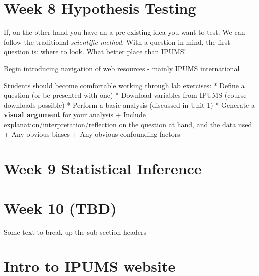 \documentclass[
]{book}
\newenvironment{Shaded}{\begin{snugshade}}{\end{snugshade}}
\newcommand{\AttributeTok}[1]{\textcolor[rgb]{0.77,0.63,0.00}{#1}}
\newcommand{\DecValTok}[1]{\textcolor[rgb]{0.00,0.00,0.81}{#1}}
\newcommand{\FunctionTok}[1]{\textcolor[rgb]{0.00,0.00,0.00}{#1}}
\newcommand{\NormalTok}[1]{#1}
\newcommand{\SpecialCharTok}[1]{\textcolor[rgb]{0.00,0.00,0.00}{#1}}
\begin{document}
\begin{Shaded}
\end{Shaded}

\hypertarget{hypothesis}{%
\section{Week 8 Hypothesis Testing}\label{hypothesis}}

If, on the other hand you have an a pre-existing idea you want to test. We can follow the traditional \emph{scientific method}. With a question in mind, the first question is: where to look. What better place than \href{https://ipums.org}{IPUMS}!

Begin introducing navigation of web resources - mainly IPUMS international

Students should become comfortable working through lab exercises:
* Define a question (or be presented with one)
* Download variables from IPUMS (course downloads possible)
* Perform a basic analysis (discussed in Unit 1)
* Generate a \textbf{visual argument} for your analysis
+ Include explanation/interpretation/reflection on the question at hand, and the data used
+ Any obvious biases
+ Any obvious confounding factors

\hypertarget{week-9-statistical-inference-1}{%
\section{Week 9 Statistical Inference}\label{week-9-statistical-inference-1}}

\hypertarget{week-10-tbd-1}{%
\section{Week 10 (TBD)}\label{week-10-tbd-1}}

Some text to break up the sub-section headers

\hypertarget{intro-to-ipums-website}{%
\section{Intro to IPUMS website}\label{intro-to-ipums-website}}
\end{document}
